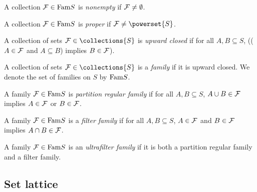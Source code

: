 \begin{definition}
    A collection $\mathcal{F} \in \text{Fam}{S}$ is \emph{nonempty} if $\mathcal{F} \neq \emptyset$.
\end{definition}

\begin{definition}
    A collection $\mathcal{F} \in \text{Fam}{S}$ is \emph{proper} if $\family \neq \powerset{S}$.
\end{definition}

\begin{definition}
    A collection of sets $\family \in \collections{S}$ is \emph{upward closed} if for all $A, B \subseteq S$, (($A \in \mathcal{F}$ and $A \subseteq B$) implies $B \in \mathcal{F}$).
\end{definition}

\begin{definition}
    A collection of sets $\family \in \collections{S}$ is a \emph{family} if it is upward closed.  We denote the set of families on $S$ by $\text{Fam}{S}$.
\end{definition}

\begin{definition}
    A family $\mathcal{F} \in \text{Fam}{S}$ is \emph{partition regular family} if for all $A, B \subseteq S$, $A \cup B \in \mathcal{F}$ implies $A \in \mathcal{F}$ or $B \in \mathcal{F}$.
\end{definition}

\begin{definition}
    A family $\mathcal{F} \in \text{Fam}{S}$ is a \emph{filter family} if for all $A, B \subseteq S$, $A \in \mathcal{F}$ and $B \in \mathcal{F}$ implies $A \cap B \in \mathcal{F}$.
\end{definition}

\begin{definition}
    A family $\mathcal{F} \in \text{Fam}{S}$ is an \emph{ultrafilter family} if it is both a partition regular family and a filter family.
\end{definition}

\subsection{Set lattice}

